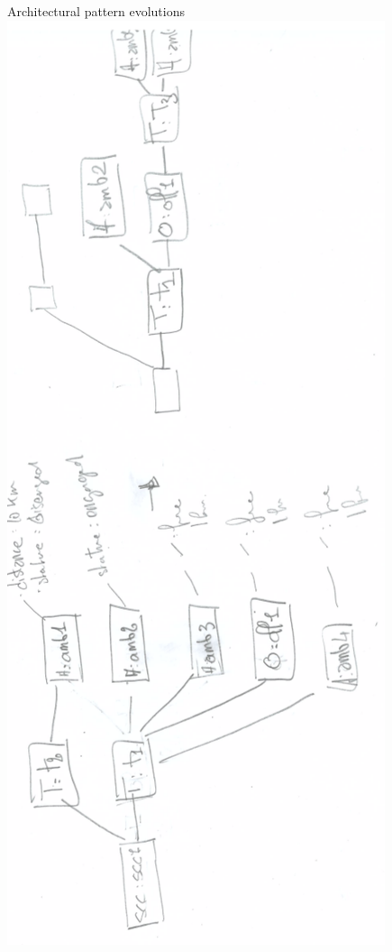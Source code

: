 \documentclass[notes]{beamer}
\begin{document}
\begin{frame}{Architectural pattern evolutions}
\includegraphics[angle=-90,scale=0.4]{cas-evolution-pattern}
\end{frame}
\end{document}
